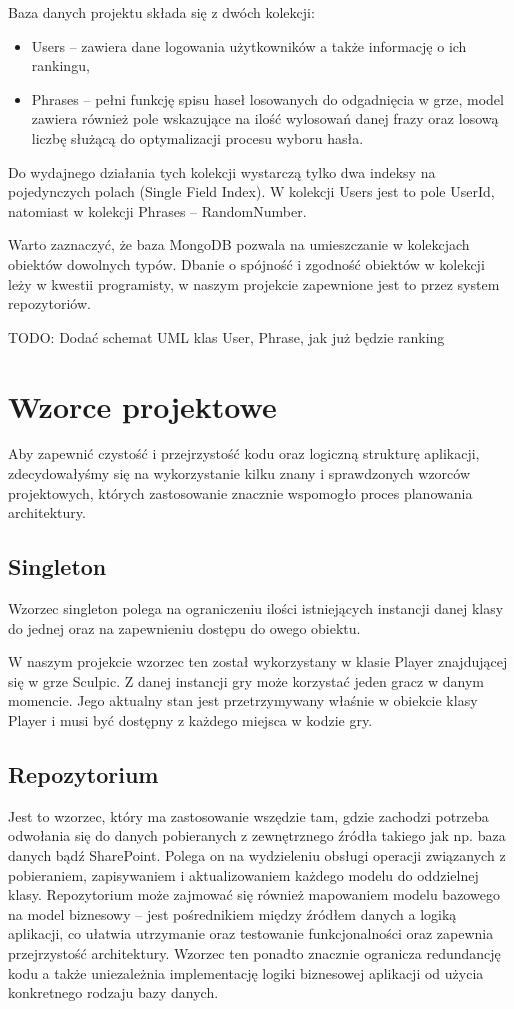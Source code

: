 Baza danych projektu składa się z dwóch kolekcji:
\begin{itemize}
    \item Users – zawiera dane logowania użytkowników a także informację o ich rankingu,
    \item Phrases – pełni funkcję spisu haseł losowanych do odgadnięcia w grze, model zawiera również pole wskazujące na ilość wylosowań danej frazy oraz losową liczbę służącą do optymalizacji procesu wyboru hasła.
\end{itemize}

Do wydajnego działania tych kolekcji wystarczą tylko dwa indeksy na pojedynczych polach (Single Field Index). W kolekcji Users jest to pole UserId, natomiast w kolekcji Phrases – RandomNumber.

Warto zaznaczyć, że baza MongoDB pozwala na umieszczanie w kolekcjach obiektów dowolnych typów. Dbanie o spójność i zgodność obiektów w kolekcji leży w kwestii programisty, w naszym projekcie zapewnione jest to przez system repozytoriów.

TODO: Dodać schemat UML klas User, Phrase, jak już będzie ranking

\section{Wzorce projektowe}
Aby zapewnić czystość i przejrzystość kodu oraz logiczną strukturę aplikacji, zdecydowałyśmy się na wykorzystanie kilku znany i sprawdzonych wzorców projektowych, których zastosowanie znacznie wspomogło proces planowania architektury.

\subsection{Singleton}
Wzorzec singleton polega na ograniczeniu ilości istniejących instancji danej klasy do jednej oraz na zapewnieniu dostępu do owego obiektu.

W naszym projekcie wzorzec ten został wykorzystany w klasie Player znajdującej się w grze Sculpic. Z danej instancji gry może korzystać jeden gracz w danym momencie. Jego aktualny stan jest przetrzymywany właśnie w obiekcie klasy Player i musi być dostępny z każdego miejsca w kodzie gry.

\subsection{Repozytorium}
Jest to wzorzec, który ma zastosowanie wszędzie tam, gdzie zachodzi potrzeba odwołania się do danych pobieranych z zewnętrznego źródła takiego jak np. baza danych bądź SharePoint. Polega on na wydzieleniu obsługi operacji związanych z pobieraniem, zapisywaniem i aktualizowaniem każdego modelu do oddzielnej klasy. Repozytorium może zajmować się również mapowaniem modelu bazowego na model biznesowy – jest pośrednikiem między źródłem danych a logiką aplikacji, co ułatwia utrzymanie oraz testowanie funkcjonalności oraz zapewnia przejrzystość architektury. Wzorzec ten ponadto znacznie ogranicza redundancję kodu a także uniezależnia implementację logiki biznesowej aplikacji od użycia konkretnego rodzaju bazy danych.

